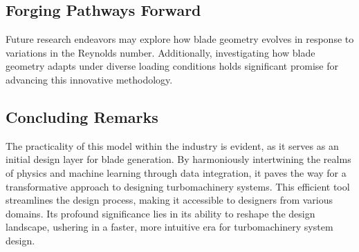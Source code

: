 \documentclass[11pt,a4paper,twocolumn]{article}
\begin{document}
\subsection{Forging Pathways Forward}

Future research endeavors may explore how blade geometry evolves in response to variations in the Reynolds number. Additionally, investigating how blade geometry adapts under diverse loading conditions holds significant promise for advancing this innovative methodology.

\subsection{Concluding Remarks}

The practicality of this model within the industry is evident, as it serves as an initial design layer for blade generation. By harmoniously intertwining the realms of physics and machine learning through data integration, it paves the way for a transformative approach to designing turbomachinery systems. This efficient tool streamlines the design process, making it accessible to designers from various domains. Its profound significance lies in its ability to reshape the design landscape, ushering in a faster, more intuitive era for turbomachinery system design.


\label{sec:bibliography}
\end{document}
